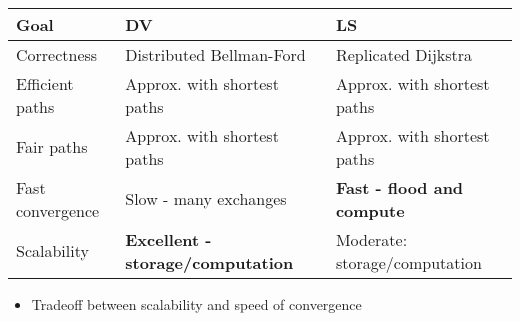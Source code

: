\begin{itemize}
    \\
\begin{tabular}{| l | l | l |}
    Goal & DV & LS\\\hline
    Correctness & Distributed Bellman-Ford & Replicated Dijkstra\\
    Efficient paths & Approx. with shortest paths & Approx. with shortest paths\\
    Fair paths & Approx. with shortest paths & Approx. with shortest paths\\
    Fast convergence & Slow - many exchanges & \textbf{Fast - flood and compute}\\
    Scalability & \textbf{Excellent - storage/computation} & Moderate: storage/computation
\end{tabular}
        \begin{itemize}
            \item Tradeoff between scalability and speed of convergence\\
        \end{itemize}
\end{itemize}
